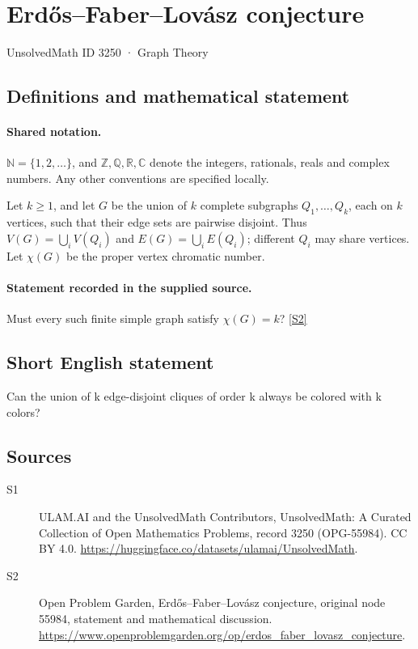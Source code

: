 \documentclass[11pt]{article}
\newcommand{\sref}[2]{\hyperlink{source:#1:#2}{[S#2]}}
\begin{document}
\setcounter{section}{3249}
\section{Erdős–Faber–Lovász conjecture}\label{3250}
{\small\sffamily UnsolvedMath ID 3250 · Graph Theory}
\subsection{Definitions and mathematical statement}

\paragraph{Shared notation.}$\mathbb N=\{1,2,\ldots\}$, and $\mathbb Z,\mathbb Q,\mathbb R,\mathbb C$ denote the integers, rationals, reals and complex numbers. Any other conventions are specified locally.


Let $k\ge1$, and let $G$ be the union of $k$ complete subgraphs $Q_1,\ldots,Q_k$, each on $k$ vertices, such that their edge sets are pairwise disjoint. Thus $V(G)=\bigcup_iV(Q_i)$ and $E(G)=\bigcup_iE(Q_i)$; different $Q_i$ may share vertices. Let $\chi(G)$ be the proper vertex chromatic number.
\paragraph{Statement recorded in the supplied source.}
Must every such finite simple graph satisfy $\chi(G)=k$? \sref{3250}{2}
\subsection{Short English statement}
Can the union of k edge-disjoint cliques of order k always be colored with k colors?
\subsection{Sources}
\begin{description}
\item[\hypertarget{source:3250:1}{S1}] ULAM.AI and the UnsolvedMath Contributors, UnsolvedMath: A Curated Collection of Open Mathematics Problems, record 3250 (OPG-55984). CC BY 4.0. \url{https://huggingface.co/datasets/ulamai/UnsolvedMath}.
\item[\hypertarget{source:3250:2}{S2}] Open Problem Garden, Erdős–Faber–Lovász conjecture, original node 55984, statement and mathematical discussion. \url{https://www.openproblemgarden.org/op/erdos_faber_lovasz_conjecture}.
\end{description}
\label{end:3250}
\end{document}
